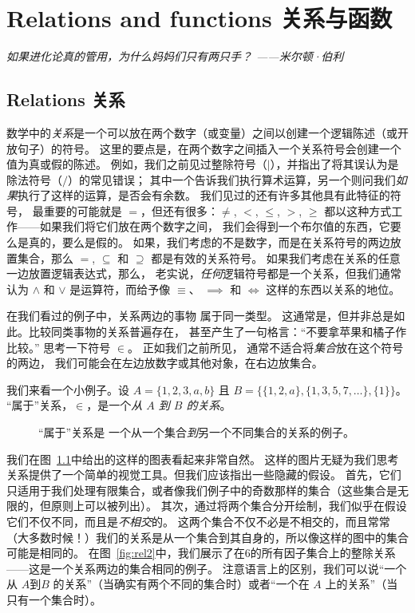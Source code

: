\chapter{Relations and functions 关系与函数}
\label{ch:rel}

{\em 如果进化论真的管用，为什么妈妈们只有两只手？
——米尔顿·伯利}

\section{Relations 关系}
\label{sec:rels}

数学中的\emph{关系}是一个可以放在两个数字（或变量）之间以创建一个逻辑陈述（或开放句子）的符号。
这里的要点是，在两个数字之间插入一个关系符号会创建一个值为真或假的陈述。
例如，我们之前见过整除符号（$\mid$），并指出了将其误认为是除法符号（$/$）的常见错误；
其中一个告诉我们执行算术运算，另一个则问我们\emph{如果}执行了这样的运算，是否会有余数。
我们见过的还有许多其他具有此特征的符号，
最重要的可能就是 $=$，但还有很多：$\neq$, $<$, $\leq$, 
$>$, $\geq$ 都以这种方式工作——如果我们将它们放在两个数字之间，
我们会得到一个布尔值的东西，它要么是真的，要么是假的。
如果，我们考虑的不是数字，而是在关系符号的两边放置集合，那么
$=$, $\subseteq$ 和 $\supseteq$ 都是有效的关系符号。
如果我们考虑在关系的任意一边放置逻辑表达式，那么，
老实说，\emph{任何}逻辑符号都是一个关系，但我们通常
认为 $\land$ 和 $\lor$ 是运算符，而给予像 $\equiv$、
$\implies$ 和 $\iff$ 这样的东西以关系的地位。

在我们看过的例子中，关系两边的事物
属于同一类型。
这通常是，但并非总是如此。比较同类事物的关系普遍存在，
甚至产生了一句格言：“不要拿苹果和橘子作比较。” 思考一下符号 $\in$。
正如我们之前所见，
通常不适合将\emph{集合}放在这个符号的两边，
我们可能会在左边放数字或其他对象，在右边放集合。

我们来看一个小例子。设 $A = \{1,2,3,a,b\}$ 且 
$B=\{ \{1,2,a\}, \{1,3,5,7,\ldots\}, \{1\} \}$。
“属于”关系，$\in$，是一个\emph{从 $A$ 到 $B$ 的关系}。

\begin{figure}[!hbtp]

\caption[一个关系的例子]{“属于”关系是
一个从一个集合\emph{到}另一个不同集合的关系的例子。}
\label{fig:rel1} 
\end{figure}

我们在图~\ref{fig:rel1}中给出的这样的图表看起来非常自然。
这样的图片无疑为我们思考关系提供了一个简单的视觉工具。但我们应该指出一些隐藏的假设。
首先，它们只适用于我们处理有限集合，或者像我们例子中的奇数那样的集合（这些集合是无限的，但原则上可以被列出）。
其次，通过将两个集合分开绘制，我们似乎在假设它们不仅不同，而且是\emph{不相交}的。
这两个集合不仅不必是不相交的，而且常常（大多数时候！）我们的关系是从一个集合到其自身的，所以像这样的图中的集合可能是相同的。
在图~\ref{fig:rel2}中，我们展示了在6的所有因子集合上的整除关系——这是一个关系两边的集合相同的例子。
注意语言上的区别，我们可以说“一个从 $A$到$B$ 的关系”（当确实有两个不同的集合时）或者“一个在 $A$ 上的关系”（当只有一个集合时）。

